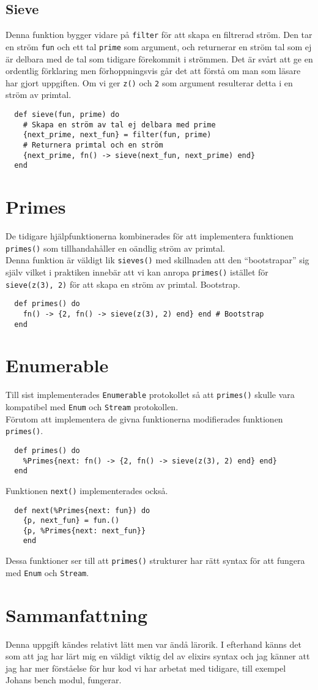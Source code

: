\documentclass[a4paper,11pt]{article}
\begin{document}
\subsection*{Sieve}
Denna funktion bygger vidare på {\tt filter} för att skapa en filtrerad ström. Den tar en ström {\tt fun} och ett tal {\tt prime} som argument, och returnerar en ström tal som ej är delbara med de tal som tidigare förekommit i strömmen. Det är svårt att ge en ordentlig förklaring men förhoppningsvis går det att förstå om man som läsare har gjort uppgiften. Om vi ger {\tt z()} och {\tt 2} som argument resulterar detta i en ström av primtal.
\begin{verbatim}
  def sieve(fun, prime) do
    # Skapa en ström av tal ej delbara med prime
    {next_prime, next_fun} = filter(fun, prime)
    # Returnera primtal och en ström
    {next_prime, fn() -> sieve(next_fun, next_prime) end}
  end
\end{verbatim}

\section*{Primes}
De tidigare hjälpfunktionerna kombinerades för att implementera funktionen {\tt primes()} som tillhandahåller en oändlig ström av primtal.\\
Denna funktion är väldigt lik {\tt sieves()} med skillnaden att den ``bootstrapar'' sig själv vilket i praktiken innebär att vi kan anropa {\tt primes()} istället för {\tt sieve(z(3), 2)} för att skapa en ström av primtal.
Bootstrap.
\begin{verbatim}
  def primes() do
    fn() -> {2, fn() -> sieve(z(3), 2) end} end # Bootstrap
  end
\end{verbatim}

\section*{Enumerable}
Till sist implementerades {\tt Enumerable} protokollet så att {\tt primes()} skulle vara kompatibel med {\tt Enum} och {\tt Stream} protokollen.\\
Förutom att implementera de givna funktionerna modifierades funktionen {\tt primes()}.
\begin{verbatim}
  def primes() do
    %Primes{next: fn() -> {2, fn() -> sieve(z(3), 2) end} end}
  end
\end{verbatim}
Funktionen {\tt next()} implementerades också.
\begin{verbatim}
  def next(%Primes{next: fun}) do
    {p, next_fun} = fun.()
    {p, %Primes{next: next_fun}}
    end
\end{verbatim}
Dessa funktioner ser till att {\tt primes()} strukturer har rätt syntax för att fungera med {\tt Enum} och {\tt Stream}.
\section*{Sammanfattning}
Denna uppgift kändes relativt lätt men var ändå lärorik. I efterhand känns det som att jag har lärt mig en väldigt viktig del av elixirs syntax och jag känner att jag har mer förståelse för hur kod vi har arbetat med tidigare, till exempel Johans bench modul, fungerar.
  
  
\end{document}
